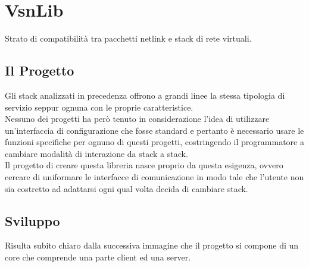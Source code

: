 

\chapter{VsnLib}                %
\lhead[\fancyplain{}{\bfseries\thepage}]{\fancyplain{}{\bfseries\rightmark}}
Strato di compatibilit\`a tra pacchetti netlink e stack di rete virtuali.

\section{Il Progetto}                 %
Gli stack analizzati in precedenza offrono a grandi linee la stessa tipologia di servizio seppur ognuna con le proprie caratteristice.\\
Nessuno dei progetti ha per\`o tenuto in considerazione l'idea di utilizzare un'interfaccia di configurazione che fosse standard e pertanto \`e necessario usare le funzioni specifiche per ognuno di questi progetti, costringendo il programmatore a cambiare modalit\`a di interazione da stack a stack.\\
Il progetto di creare questa libreria nasce proprio da questa esigenza, ovvero cercare di uniformare le interfacce di comunicazione in modo tale che l'utente non sia costretto ad adattarsi ogni qual volta decida di cambiare stack.\\


\section{Sviluppo}
Risulta subito chiaro dalla successiva immagine che il progetto si compone di un core che comprende una parte client ed una server.\\

